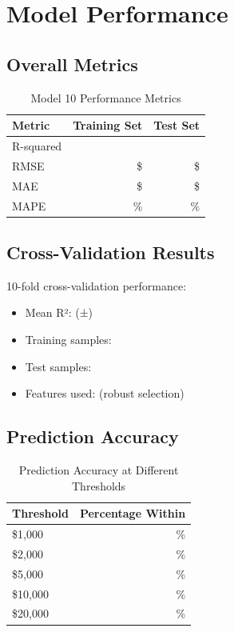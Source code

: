 \section{Model Performance}

\subsection{Overall Metrics}

\begin{table}[h]
\centering
\caption{Model 10 Performance Metrics}
\begin{tabular}{lrr}
\toprule
\textbf{Metric} & \textbf{Training Set} & \textbf{Test Set} \\
\midrule
R-squared & \ModelTenRSquaredTrain{} & \ModelTenRSquaredTest{} \\
RMSE & \$\ModelTenRMSETrain{} & \$\ModelTenRMSETest{} \\
MAE & \$\ModelTenMAETrain{} & \$\ModelTenMAETest{} \\
MAPE & \ModelTenMAPETrain{}\% & \ModelTenMAPETest{}\% \\
\bottomrule
\end{tabular}
\end{table}

\subsection{Cross-Validation Results}

10-fold cross-validation performance:
\begin{itemize}
    \item Mean R²: \ModelTenCVMean{} (±\ModelTenCVStd{})
    \item Training samples: \ModelTenTrainingSamples{}
    \item Test samples: \ModelTenTestSamples{}
    \item Features used: \ModelTenRobustFeatures{} (robust selection)
\end{itemize}

\subsection{Prediction Accuracy}

\begin{table}[h]
\centering
\caption{Prediction Accuracy at Different Thresholds}
\begin{tabular}{lr}
\toprule
\textbf{Threshold} & \textbf{Percentage Within} \\
\midrule
\$1,000 & \ModelTenWithinOneK{}\% \\
\$2,000 & \ModelTenWithinTwoK{}\% \\
\$5,000 & \ModelTenWithinFiveK{}\% \\
\$10,000 & \ModelTenWithinTenK{}\% \\
\$20,000 & \ModelTenWithinTwentyK{}\% \\
\bottomrule
\end{tabular}
\end{table}

